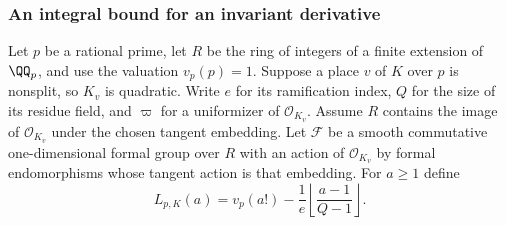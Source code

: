 \documentclass[a4paper,11pt]{article}
\theoremstyle{definition}
\theoremstyle{remark}
\numberwithin{equation}{section}
\newcommand{\OO}{\mathcal O}
\begin{document}
\subsubsection{An integral bound for an invariant derivative}\label{nav:V-01}
Let \(p\) be a rational prime, let \(R\) be the ring of integers of a finite extension of \(\QQ_p\), and use the valuation \(v_p(p)=1\). Suppose a place \(v\) of \(K\) over \(p\) is nonsplit, so \(K_v\) is quadratic. Write \(e\) for its ramification index, \(Q\) for the size of its residue field, and \(\varpi\) for a uniformizer of \(\OO_{K_v}\). Assume \(R\) contains the image of \(\OO_{K_v}\) under the chosen tangent embedding. Let \(\mathcal F\) be a smooth commutative one-dimensional formal group over \(R\) with an action of \(\OO_{K_v}\) by formal endomorphisms whose tangent action is that embedding. For \(a\ge1\) define
\[
 L_{p,K}(a)=v_p(a!)-\frac1e
                        \left\lfloor\frac{a-1}{Q-1}\right\rfloor .
\]
\end{document}
